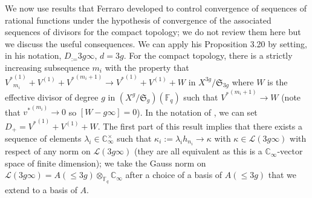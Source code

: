 \documentclass[11pt]{amsart}
\numberwithin{equation}{section}
\newcommand{\FF}{\mathbb{F}}
\newcommand{\CC}{\mathbb{C}}
\begin{document}
We now use results that Ferraro developed to control convergence of sequences of rational functions under the hypothesis of convergence of the associated sequences of divisors for the compact topology; we do not review them here but we discuss the useful consequences. We can apply his Proposition 3.20 by setting, in his notation,
$D_:=3g\infty$, $d=3g$. For the compact topology, there is a strictly increasing subsequence $m_i$ with the property that
${V^*}^{(1)}_{m_i}+V^{(1)}+{V^*}^{(m_i+1)}\rightarrow {V^*}^{(1)}+V^{(1)}+W$ in $X^{3g}/\mathfrak{S}_{3g}$ where $W$ is the
effective divisor of degree $g$ in $(X^{g}/\mathfrak{S}_{g})(\FF_q)$ such that ${V^*}^{(m_i+1)}\rightarrow W$ (note that
${v^*}^{(m_i)}\rightarrow0$ so $[W-g\infty]=0$). In the notation of \cite[Proposition 3.20]{FER1}, we can set
$D_+={V^*}^{(1)}+V^{(1)}+W$. The first part of this result implies that there exists a sequence of elements $\lambda_{i}\in\CC_\infty^\times$ such that $\kappa_i:=\lambda_ih_{n_i}\rightarrow \kappa$ with $\kappa\in\mathcal{L}(3g\infty)$
with respect of any norm on $\mathcal{L}(3g\infty)$ (they are all equivalent as this is a $\CC_\infty$-vector space of finite dimension); we take the Gauss norm on $\mathcal{L}(3g\infty)=A(\leq 3g)\otimes_{\FF_q}\CC_\infty$ after a choice of a basis of $A(\leq 3g)$ that we extend to a basis of $A$. 
\end{document}
